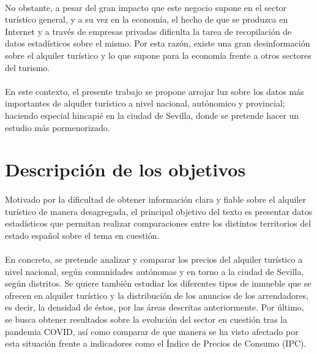 \documentclass[a4paper,10pt]{article}
\begin{document}
\begin{multicols}{2}
            \paragraph*{}
            No obstante, a pesar del gran impacto que este negocio supone en el sector turístico general, y a su vez en la economía, el hecho de que se
            produzca en Internet y a través de empresas privadas dificulta la tarea de recopilación de datos estadísticos sobre el mismo. Por esta razón,
            existe una gran desinformación sobre el alquiler turístico y lo que supone para la economía frente a otros sectores del turismo.

            \paragraph*{}
            En este contexto, el presente trabajo se propone arrojar luz sobre los datos más importantes de alquiler turístico a nivel nacional, autónomico y 
            provincial; haciendo especial hincapié en la ciudad de Sevilla, donde se pretende hacer un estudio más pormenorizado. 

        \section{Descripción de los objetivos}

            \paragraph*{}
            Motivado por la dificultad de obtener información clara y fiable sobre el alquiler turístico de manera desagregada,
            el principal objetivo del texto es presentar datos estadísticos que permitan realizar comparaciones entre los distintos
            territorios del estado español sobre el tema en cuestión.
            
            \paragraph*{}
            En concreto, se pretende analizar y comparar los precios del alquiler turístico a nivel nacional, según comunidades 
            autónomas y en torno a la ciudad de Sevilla, según distritos. Se quiere también estudiar los diferentes tipos de 
            inmueble que se ofrecen en alquiler turístico y la distribución de los anuncios de los arrendadores, es decir, la densidad de éstos, por las áreas 
            descritas anteriormente. Por último, se busca obtener resultados sobre la evolución del sector en cuestión tras la pandemia COVID, así como 
            comparar de que manera se ha visto afectado por esta situación frente a indicadores como el Índice de Precios de Consumo (IPC).
       

\end{multicols}
\end{document}
